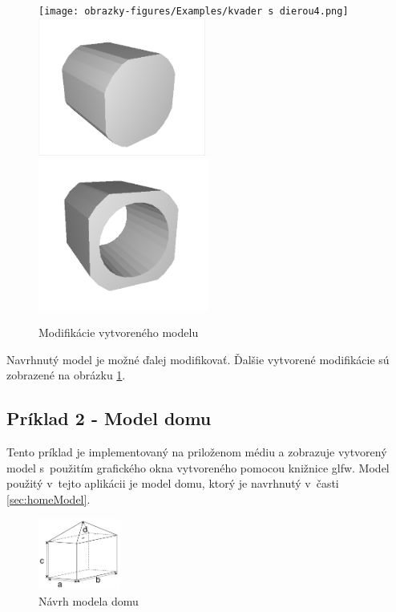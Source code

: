 \begin{figure}[H]
	\centering
	\texttt{[image: obrazky-figures/Examples/kvader s~dierou4.png]}
	\includegraphics[trim=10 10 10 10,clip,width=0.49\textwidth]{obrazky-figures/Examples/followUp.png}
	\includegraphics[trim=10 10 10 10,clip,width=0.50\textwidth]{obrazky-figures/Examples/followup3.png}
	\caption{Modifikácie vytvoreného modelu}
	\label{fig:qwert}
\end{figure}

Navrhnutý model je možné ďalej modifikovať. Ďalšie vytvorené modifikácie sú zobrazené na obrázku \ref{fig:qwert}.



\newpage
\subsection*{Príklad 2 - Model domu}\label{priklad2}
Tento príklad je implementovaný na priloženom médiu a zobrazuje vytvorený model s~použitím grafického okna vytvoreného pomocou knižnice glfw. Model použitý v~tejto aplikácii je model domu, ktorý je navrhnutý v~časti \ref{sec:homeModel}.


\begin{figure}[H]
	\centering
	\includegraphics[width=0.24\textwidth]{obrazky-figures/Examples/B4.pdf}
	\caption{Návrh modela domu}
	\label{fig:homeModelnavrh}
\end{figure}

